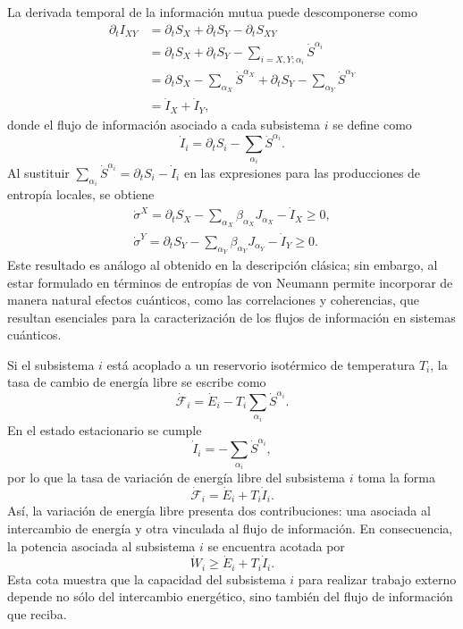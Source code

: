 La derivada temporal de la información mutua puede descomponerse como
\begin{align*}
    \partial_{t}I_{XY} & = \partial_{t}S_{X} + \partial_{t}S_{Y} - \partial_{t}S_{XY} \\
        & = \partial_{t}S_{X} + \partial_{t}S_{Y} - \sum_{i=X,Y;\alpha_{i}}\dot{S}^{\alpha_{i}} \\
        & = \partial_{t}S_{X} - \sum_{\alpha_{X}} \dot{S}^{\alpha_{X}} + \partial_{t}S_{Y} - \sum_{\alpha_{Y}} \dot{S}^{\alpha_{Y}} \\
        & = \dot{I}_{X} + \dot{I}_{Y},
\end{align*}
donde el flujo de información asociado a cada subsistema $i$ se define como
\[
    \dot{I}_{i} = \partial_{t} S_{i} - \sum_{\alpha_{i}} \dot{S}^{\alpha_{i}}.
\]
Al sustituir $\sum_{\alpha_{i}} \dot{S}^{\alpha_{i}} = \partial_{t} S_{i} - \dot{I}_{i}$ en las expresiones para las producciones de entropía locales, se obtiene
\begin{align}
    \dot{\sigma}^{X} = \partial_{t}S_{X} - \sum_{\alpha_{X}} \beta_{\alpha_{X}} J_{\alpha_{X}} - \dot{I}_{X} \geq 0, \\
    \dot{\sigma}^{Y} = \partial_{t}S_{Y} - \sum_{\alpha_{Y}} \beta_{\alpha_{Y}} J_{\alpha_{Y}} - \dot{I}_{Y} \geq 0.
    \label{sec4:localentropyquantum}
\end{align}
Este resultado es análogo al obtenido en la descripción clásica; sin embargo, al estar formulado en términos de entropías de von Neumann permite incorporar de manera natural efectos cuánticos, como las correlaciones y coherencias, que resultan esenciales para la caracterización de los flujos de información en sistemas cuánticos.

Si el subsistema $i$ está acoplado a un reservorio isotérmico de temperatura $T_i$, la tasa de cambio de energía libre se escribe como
\[
    \dot{\mathcal{F}}_{i} = \dot{E}_{i} - T_{i} \sum_{\alpha_{i}}\dot{S}^{\alpha_{i}}.
\]
En el estado estacionario se cumple
\[
    \dot{I}_{i} = - \sum_{\alpha_{i}}\dot{S}^{\alpha_{i}},
\]
por lo que la tasa de variación de energía libre del subsistema $i$ toma la forma
\[
    \dot{\mathcal{F}}_{i} = \dot{E}_{i} + T_{i} \dot{I}_{i}.
\]
Así, la variación de energía libre presenta dos contribuciones: una asociada al intercambio de energía y otra vinculada al flujo de información. En consecuencia, la potencia asociada al subsistema $i$ se encuentra acotada por
\[
    \dot{W}_{i} \geq \dot{E}_{i} + T_{i}\dot{I}_{i}.
\]
Esta cota muestra que la capacidad del subsistema $i$ para realizar trabajo externo depende no sólo del intercambio energético, sino también del flujo de información que reciba.

